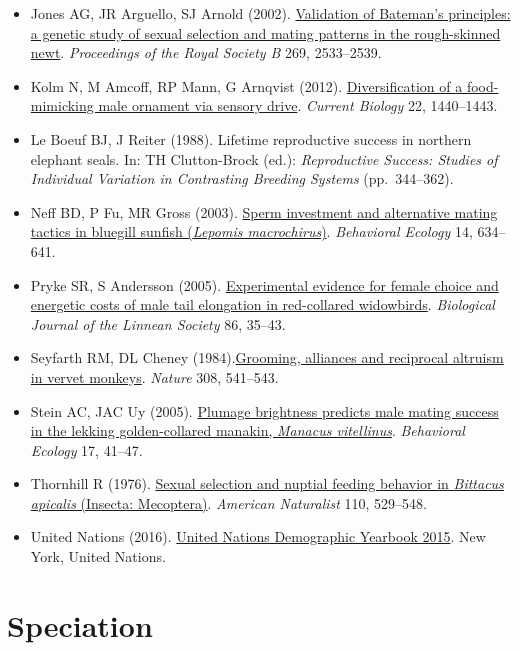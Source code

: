 \documentclass[
]{book}
\begin{document}
\begin{itemize}
\item
  Jones AG, JR Arguello, SJ Arnold (2002). \href{https://royalsocietypublishing.org/doi/10.1098/rspb.2002.2177}{Validation of Bateman's principles: a genetic study of sexual selection and mating patterns in the rough-skinned newt}. \emph{Proceedings of the Royal Society B} 269, 2533--2539.
\item
  Kolm N, M Amcoff, RP Mann, G Arnqvist (2012). \href{https://www.sciencedirect.com/science/article/pii/S0960982212006380?via\%3Dihub}{Diversification of a food-mimicking male ornament via sensory drive}. \emph{Current Biology} 22, 1440--1443.
\item
  Le Boeuf BJ, J Reiter (1988). Lifetime reproductive success in northern elephant seals. In: TH Clutton-Brock (ed.): \emph{Reproductive Success: Studies of Individual Variation in Contrasting Breeding Systems} (pp.~344--362).
\item
  Neff BD, P Fu, MR Gross (2003). \href{https://academic.oup.com/beheco/article/14/5/634/186409}{Sperm investment and alternative mating tactics in bluegill sunfish (\emph{Lepomis macrochirus})}. \emph{Behavioral Ecology} 14, 634--641.
\item
  Pryke SR, S Andersson (2005). \href{https://academic.oup.com/biolinnean/article/86/1/35/2691528}{Experimental evidence for female choice and energetic costs of male tail elongation in red-collared widowbirds}. \emph{Biological Journal of the Linnean Society} 86, 35--43.
\item
  Seyfarth RM, DL Cheney (1984).\href{https://www.nature.com/articles/308541a0}{Grooming, alliances and reciprocal altruism in vervet monkeys}. \emph{Nature} 308, 541--543.
\item
  Stein AC, JAC Uy (2005). \href{https://academic.oup.com/beheco/article/17/1/41/266852}{Plumage brightness predicts male mating success in the lekking golden-collared manakin, \emph{Manacus vitellinus}}. \emph{Behavioral Ecology} 17, 41--47.
\item
  Thornhill R (1976). \href{https://www.journals.uchicago.edu/doi/abs/10.1086/283089}{Sexual selection and nuptial feeding behavior in \emph{Bittacus apicalis} (Insecta: Mecoptera)}. \emph{American Naturalist} 110, 529--548.
\item
  United Nations (2016). \href{https://www.un-ilibrary.org/content/books/9789210584548}{United Nations Demographic Yearbook 2015}. New York, United Nations.
\end{itemize}

\hypertarget{speciation-1}{%
\chapter{Speciation}\label{speciation-1}}
\end{document}
